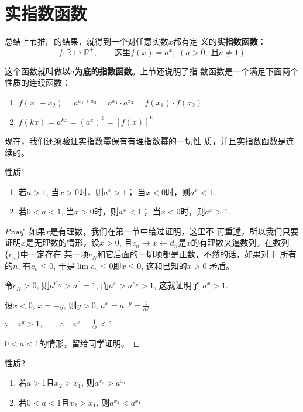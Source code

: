\section{实指数函数}
总结上节推广的结果，就得到一个对任意实数$x$都有定
义的\textbf{实指数函数}：
\[f:\mathbb{R}\mapsto \mathbb{R}^+,\qquad \text{这里} f(x)=a^x,\; (a>0, \; \text{且}a\ne 1)\]

这个函数就叫做\textbf{以$a$为底的指数函数}。上节还说明了指
数函数是一个满足下面两个性质的连续函数：
\begin{enumerate}
  \item $f(x_1+x_2)=a^{x_1+x_2}=a^{x_1}\cdot a^{x_2}=f(x_1)\cdot f(x_2)$
  \item $f(kx)=a^{kx}=(a^x)^k=[f(x)]^k$
\end{enumerate}

现在，我们还须验证实指数幂保有有理指数幂的一切性
质，并且实指数函数是连续的。

\begin{blk}{性质1}
\begin{enumerate}
  \item 若$a>1$, 当$x>0$时，则$a^x>1$；
当$x<0$时，则$a^x<1$.
\item 若$0<a<1$, 当$x>0$时，则$a^x<1$； 
当$x<0$时，则$a^x>1$.
\end{enumerate}
\end{blk}

\begin{proof}
  如果$x$是有理数，我们在第一节中给过证明，这里不
再重述，所以我们只要证明$x$是无理数的情形，设$x>0$,
且$c_n\to x\leftarrow d_n$是$x$的有理数夹逼数列。在数列$\{c_n\}$中一定存在
某一项$c_N$和它后面的一切项都是正数，不然的话，如果对于
所有的$n$, 有$c_n\le 0$, 于是$\lim c_n\le 0$即$x\le 0$, 这和已知的$x>0$
矛盾。

令$c_N>0$, 则$a^{C_N}>a^0=1$, 而$a^x>a^{c_N}>1$, 这就证明了
$a^x>1$.

设$x<0$, $x=-y$, 则$y>0$, $a^x=a^{-y}=\frac{1}{a^y}$

$\because\quad a^y>1,\qquad \therefore\quad a^x=\frac{1}{a^y}<1$

$0<a<1$的情形，留给同学证明。
\end{proof}

\begin{blk}{性质2}
\begin{enumerate}
  \item 若$a>1$且$x_2>x_1$, 则$a^{x_2}>a^{x_1}$
  \item 若$0<a<1$且$x_2>x_1$, 则$a^{x_2}<a^{x_1}$
\end{enumerate}
\end{blk}

